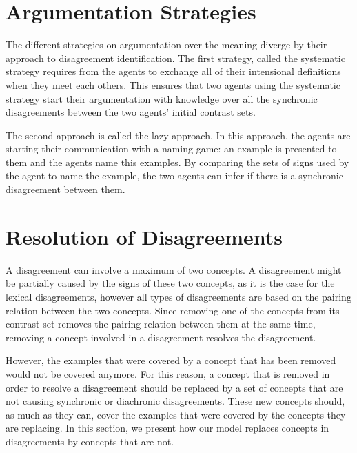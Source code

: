 \section{Argumentation Strategies}

The different strategies on argumentation over the meaning diverge by their approach to disagreement identification. The first strategy, called the systematic strategy requires from the agents to exchange all of their intensional definitions when they meet each others. This ensures that two agents using the systematic strategy start their argumentation with knowledge over all the synchronic disagreements between the two agents' initial contrast sets.

The second approach is called the lazy approach. In this approach, the agents are starting their communication with a naming game: an example is presented to them and the agents name this examples. By comparing the sets of signs used by the agent to name the example, the two agents can infer if there is a synchronic disagreement between them.

\section{Resolution of Disagreements}
\label{sec:Resolution}

A disagreement can involve a maximum of two concepts. A disagreement might be partially caused by the signs of these two concepts, as it is the case for the lexical disagreements, however all types of disagreements are based on the pairing relation between the two concepts. Since removing one of the concepts from its contrast set removes the pairing relation between them at the same time, removing a concept involved in a disagreement resolves the disagreement.

However, the examples that were covered by a concept that has been removed would not be covered anymore. For this reason, a concept that is removed in order to resolve a disagreement should be replaced by a set of concepts that are not causing synchronic or diachronic disagreements. These new concepts should, as much as they can, cover the examples that were covered by the concepts they are replacing. In this section, we present how our model replaces concepts in disagreements by concepts that are not.

